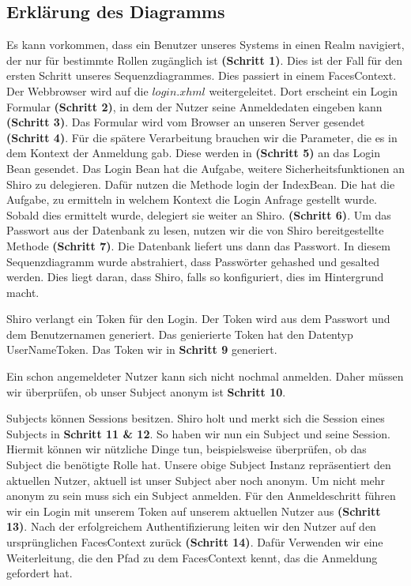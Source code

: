 \documentclass[enabledeprecatedfontcommands,fontsize=12pt,paper=a4,twoside]{scrartcl}
\begin{document}
{\subsection{Erklärung des Diagramms}
Es kann vorkommen, dass ein Benutzer unseres Systems in einen Realm navigiert,
der nur für bestimmte Rollen zugänglich ist \textbf{(Schritt 1)}. Dies ist der Fall
für den ersten Schritt unseres Sequenzdiagrammes. Dies passiert in einem
FacesContext. Der Webbrowser wird auf die $login.xhml$ weitergeleitet. Dort erscheint
ein Login Formular \textbf{(Schritt 2)}, in dem der Nutzer seine Anmeldedaten
eingeben kann \textbf{(Schritt 3)}. Das Formular wird vom Browser an unseren
Server gesendet \textbf{(Schritt 4)}. Für die spätere Verarbeitung brauchen
wir die Parameter, die es in dem Kontext der Anmeldung gab. Diese werden in
\textbf{(Schritt 5)} an das Login Bean gesendet. Das Login Bean hat die Aufgabe,
weitere Sicherheitsfunktionen an Shiro zu delegieren. Dafür nutzen die Methode login
der IndexBean. Die hat die Aufgabe, zu ermitteln in welchem Kontext die
Login Anfrage gestellt wurde. Sobald dies ermittelt wurde, delegiert sie
weiter an Shiro. \textbf{(Schritt 6)}. Um das Passwort aus der Datenbank zu lesen,
nutzen wir die von Shiro bereitgestellte Methode \textbf{(Schritt 7)}. Die Datenbank
liefert uns dann das Passwort. In diesem Sequenzdiagramm wurde abstrahiert, dass
Passwörter gehashed und gesalted werden. Dies liegt daran, dass Shiro, falls so
konfiguriert, dies im Hintergrund macht.

Shiro verlangt ein Token für den Login. Der Token wird aus dem Passwort
und dem Benutzernamen generiert. Das genierierte Token hat den Datentyp
UserNameToken.  Das Token wir in \textbf{Schritt 9} generiert.


Ein schon angemeldeter Nutzer kann sich nicht nochmal anmelden. Daher müssen wir
überprüfen, ob unser Subject anonym ist \textbf{Schritt 10}.

Subjects können Sessions besitzen. Shiro holt und merkt sich die Session eines
Subjects in \textbf{Schritt 11 \& 12}. So haben wir nun ein Subject und seine Session.
Hiermit können wir nützliche Dinge tun, beispielsweise überprüfen, ob das
Subject die benötigte Rolle hat. Unsere obige Subject Instanz repräsentiert
den aktuellen Nutzer, aktuell ist unser Subject aber noch anonym. Um nicht mehr
anonym zu sein muss sich ein Subject anmelden. Für den Anmeldeschritt führen wir
ein Login mit unserem Token auf unserem aktuellen Nutzer aus \textbf{(Schritt
  13)}. Nach der erfolgreichem Authentifizierung leiten wir den Nutzer auf den
ursprünglichen FacesContext zurück \textbf{(Schritt 14)}. Dafür Verwenden wir
eine Weiterleitung, die den Pfad zu dem FacesContext kennt, das die Anmeldung
gefordert hat.

}
\end{document}
